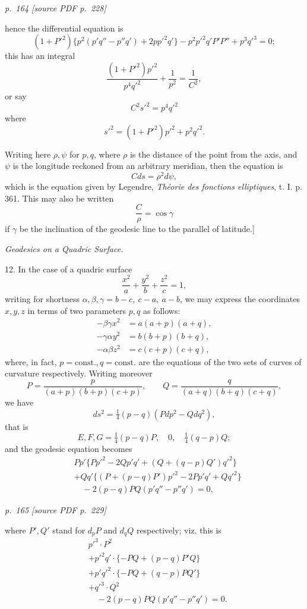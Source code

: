 \documentclass[11pt,a4paper]{article}
\newcommand{\sourcepage}[2]{%
  \bigskip
  \noindent\textit{p.~#1 [source PDF p.~#2]}%
  \par\smallskip
}
\begin{document}
\sourcepage{164}{228}

hence the differential equation is
\[
(1+P'^2)\{p^2(p'q''-p''q')+2pp'^2q'\}-p^2p'^2q'P'P''+p^3q'^3=0;
\]
this has an integral
\[
\frac{(1+P'^2)p'^2}{p^4q'^2}+\frac1{p^2}=\frac1{C^2},
\]
or say
\[
C^2s'^2=p^4q'^2
\]
where
\[
s'^2=(1+P'^2)p'^2+p^2q'^2.
\]

Writing here \(\rho,\psi\) for \(p,q\), where \(\rho\) is the distance of the point
from the axis, and \(\psi\) is the longitude reckoned from an arbitrary meridian, then
the equation is
\[
Cds=\rho^2d\psi,
\]
which is the equation given by Legendre, \emph{Th\'eorie des fonctions elliptiques},
t. I. p. 361. This may also be written
\[
\frac{C}{\rho}=\cos\gamma
\]
if \(\gamma\) be the inclination of the geodesic line to the parallel of latitude.]

\begin{center}\itshape Geodesics on a Quadric Surface.\end{center}

12. In the case of a quadric surface
\[
\frac{x^2}{a}+\frac{y^2}{b}+\frac{z^2}{c}=1,
\]
writing for shortness \(\alpha,\beta,\gamma=b-c,\ c-a,\ a-b\), we may express the
coordinates \(x,y,z\) in terms of two parameters \(p,q\) as follows:
\[
\begin{aligned}
-\beta\gamma x^2&=a(a+p)(a+q),\\
-\gamma\alpha y^2&=b(b+p)(b+q),\\
-\alpha\beta z^2&=c(c+p)(c+q),
\end{aligned}
\]
where, in fact, \(p=\mathrm{const.}, q=\mathrm{const.}\) are the equations of the two
sets of curves of curvature respectively. Writing moreover
\[
P=\frac{p}{(a+p)(b+p)(c+p)},\qquad
Q=\frac{q}{(a+q)(b+q)(c+q)},
\]
we have
\[
ds^2=\tfrac14(p-q)(Pdp^2-Qdq^2),
\]
that is
\[
E,F,G=\tfrac14(p-q)P,\quad 0,\quad \tfrac14(q-p)Q;
\]
and the geodesic equation becomes
\[
\begin{aligned}
&Pp'\{Pp'^2-2Qp'q'+(Q+(q-p)Q')q'^2\}\\
&+Qq'\{(P+(p-q)P')p'^2-2Pp'q'+Qq'^2\}\\
&\quad-2(p-q)PQ(p'q''-p''q')=0,
\end{aligned}
\]

\sourcepage{165}{229}

where \(P',Q'\) stand for \(d_pP\) and \(d_qQ\) respectively; viz. this is
\[
\begin{aligned}
&p'^3\cdot P^2\\
&+p'^2q'\cdot\{-PQ+(p-q)P'Q\}\\
&+p'q'^2\cdot\{-PQ+(q-p)PQ'\}\\
&+q'^3\cdot Q^2\\
&\quad-2(p-q)PQ(p'q''-p''q')=0.
\end{aligned}
\]
\end{document}
